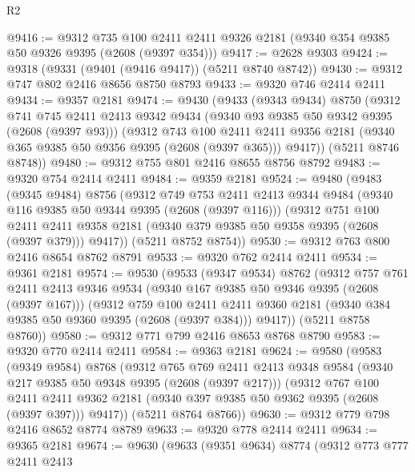 \begin{lexlean}{R2}
\begin{coremodule}
@9416 := @9312
    @735
    @100
    @2411
    @2411
    @9326
    @2181
    (@9340 @354 @9385 @50 @9326 @9395 (@2608 (@9397 @354)))
@9417 := @2628 @9303
@9424 := @9318 (@9331 (@9401 (@9416 @9417)) (@5211 @8740 @8742))
@9430 := @9312 @747 @802 @2416 @8656 @8750 @8793
@9433 := @9320 @746 @2414 @2411
@9434 := @9357 @2181
@9474 := @9430
    (@9433
      (@9343 @9434)
      @8750
      (@9312
        @741
        @745
        @2411
        @2413
        @9342
        @9434
        (@9340 @93 @9385 @50 @9342 @9395 (@2608 (@9397 @93)))
        (@9312
          @743
          @100
          @2411
          @2411
          @9356
          @2181
          (@9340 @365 @9385 @50 @9356 @9395 (@2608 (@9397 @365)))
          @9417))
      (@5211 @8746 @8748))
@9480 := @9312 @755 @801 @2416 @8655 @8756 @8792
@9483 := @9320 @754 @2414 @2411
@9484 := @9359 @2181
@9524 := @9480
    (@9483
      (@9345 @9484)
      @8756
      (@9312
        @749
        @753
        @2411
        @2413
        @9344
        @9484
        (@9340 @116 @9385 @50 @9344 @9395 (@2608 (@9397 @116)))
        (@9312
          @751
          @100
          @2411
          @2411
          @9358
          @2181
          (@9340 @379 @9385 @50 @9358 @9395 (@2608 (@9397 @379)))
          @9417))
      (@5211 @8752 @8754))
@9530 := @9312 @763 @800 @2416 @8654 @8762 @8791
@9533 := @9320 @762 @2414 @2411
@9534 := @9361 @2181
@9574 := @9530
    (@9533
      (@9347 @9534)
      @8762
      (@9312
        @757
        @761
        @2411
        @2413
        @9346
        @9534
        (@9340 @167 @9385 @50 @9346 @9395 (@2608 (@9397 @167)))
        (@9312
          @759
          @100
          @2411
          @2411
          @9360
          @2181
          (@9340 @384 @9385 @50 @9360 @9395 (@2608 (@9397 @384)))
          @9417))
      (@5211 @8758 @8760))
@9580 := @9312 @771 @799 @2416 @8653 @8768 @8790
@9583 := @9320 @770 @2414 @2411
@9584 := @9363 @2181
@9624 := @9580
    (@9583
      (@9349 @9584)
      @8768
      (@9312
        @765
        @769
        @2411
        @2413
        @9348
        @9584
        (@9340 @217 @9385 @50 @9348 @9395 (@2608 (@9397 @217)))
        (@9312
          @767
          @100
          @2411
          @2411
          @9362
          @2181
          (@9340 @397 @9385 @50 @9362 @9395 (@2608 (@9397 @397)))
          @9417))
      (@5211 @8764 @8766))
@9630 := @9312 @779 @798 @2416 @8652 @8774 @8789
@9633 := @9320 @778 @2414 @2411
@9634 := @9365 @2181
@9674 := @9630
    (@9633
      (@9351 @9634)
      @8774
      (@9312
        @773
        @777
        @2411
        @2413

\end{coremodule}
\end{lexlean}
